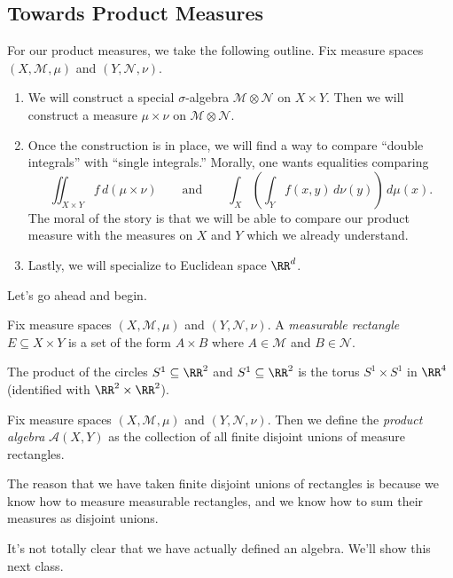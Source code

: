 \documentclass[../notes.tex]{subfiles}
\begin{document}
\subsection{Towards Product Measures}
For our product measures, we take the following outline. Fix measure spaces $(X,\mathcal M,\mu)$ and $(Y,\mathcal N,\nu)$.
\begin{enumerate}
	\item We will construct a special $\sigma$-algebra $\mathcal M\otimes\mathcal N$ on $X\times Y$. Then we will construct a measure $\mu\times\nu$ on $\mathcal M\otimes\mathcal N$.
	\item Once the construction is in place, we will find a way to compare ``double integrals'' with ``single integrals.'' Morally, one wants equalities comparing
	\[\iint_{X\times Y}f\,d(\mu\times\nu)\qquad\text{and}\qquad\int_X\left(\int_Yf(x,y)\,d\nu(y)\right)\,d\mu(x).\]
	The moral of the story is that we will be able to compare our product measure with the measures on $X$ and $Y$ which we already understand.
	\item Lastly, we will specialize to Euclidean space $\RR^d$.
\end{enumerate}
Let's go ahead and begin.
\begin{definition}
	Fix measure spaces $(X,\mathcal M,\mu)$ and $(Y,\mathcal N,\nu)$. A \textit{measurable rectangle} $E\subseteq X\times Y$ is a set of the form $A\times B$ where $A\in\mathcal M$ and $B\in\mathcal N$.
\end{definition}
\begin{example}
	The product of the circles $S^1\subseteq\RR^2$ and $S^1\subseteq\RR^2$ is the torus $S^1\times S^1$ in $\RR^4$ (identified with $\RR^2\times\RR^2$).
\end{example}
\begin{definition}
	Fix measure spaces $(X,\mathcal M,\mu)$ and $(Y,\mathcal N,\nu)$. Then we define the \textit{product algebra} $\mathcal A(X,Y)$ as the collection of all finite disjoint unions of measure rectangles.
\end{definition}
\begin{remark}
	The reason that we have taken finite disjoint unions of rectangles is because we know how to measure measurable rectangles, and we know how to sum their measures as disjoint unions.
\end{remark}
It's not totally clear that we have actually defined an algebra. We'll show this next class.
\end{document}
